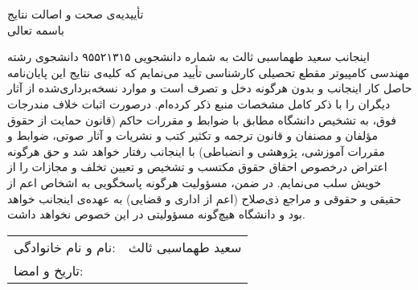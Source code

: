 \newpage
\thispagestyle{empty}

\begin{center}
{\Large
    تأییدیه‌ی صحت و اصالت نتایج \\
}
\vspace{.5cm}
باسمه تعالی
\vspace{.5cm}
\end{center}

اینجانب
سعید طهماسبی ثالث
به شماره دانشجویی
۹۵۵۲۱۳۱۵
دانشجوی رشته
مهندسی کامپیوتر
مقطع تحصیلی
کارشناسی
تأیید می‌نمایم كه كلیه‌ی نتایج این پایان‌نامه حاصل كار اینجانب و بدون هرگونه دخل و تصرف است و موارد نسخه‌برداری‌شده از آثار دیگران را با ذكر كامل مشخصات منبع ذكر كرده‌ام. درصورت اثبات خلاف مندرجات فوق، به تشخیص دانشگاه مطابق با ضوابط و مقررات حاكم (قانون حمایت از حقوق مؤلفان و مصنفان و قانون ترجمه و تكثیر كتب و نشریات و آثار صوتی، ضوابط و مقررات آموزشی، پژوهشی و انضباطی) با اینجانب رفتار خواهد شد و حق هرگونه اعتراض درخصوص احقاق حقوق مكتسب و تشخیص و تعیین تخلف و مجازات را از خویش سلب می‌نمایم. در ضمن، مسؤولیت هرگونه پاسخگویی به اشخاص اعم از حقیقی و حقوقی و مراجع ذی‌صلاح (اعم از اداری و قضایی) به عهده‌ی اینجانب خواهد بود و دانشگاه هیچ‌گونه مسؤولیتی در این خصوص نخواهد داشت.

\vspace{.5cm}
\begin{flushleft}
\begin{tabular}{lr}
نام و نام خانوادگی:   & 	سعید طهماسبی ثالث \\
تاریخ و امضا: & \\
\end{tabular}
\end{flushleft}
\cleardoublepage